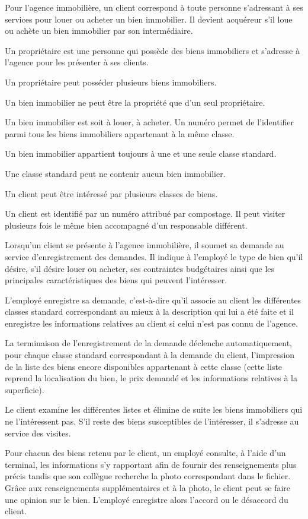 Pour l'agence immobilière, un client correspond à toute personne s'adressant à ses services pour louer ou acheter un bien immobilier. Il devient acquéreur s'il loue ou achète un bien immobilier par son intermédiaire.

Un propriétaire est une personne qui possède des biens immobiliers et s'adresse à l'agence pour les présenter à ses clients.

Un propriétaire peut posséder plusieurs biens immobiliers.

Un bien immobilier ne peut être la propriété que d'un seul propriétaire.

Un bien immobilier est soit à louer, à acheter. Un numéro permet de l'identifier parmi tous les biens immobiliers appartenant à la même classe.

Un bien immobilier appartient toujours à une et une seule classe standard.

Une classe standard peut ne contenir aucun bien immobilier.

Un client peut être intéressé par plusieurs classes de biens.

Un client est identifié par un numéro attribué par compostage. Il peut visiter plusieurs fois le même bien accompagné d'un responsable différent.

Lorsqu'un client se présente à l'agence immobilière, il soumet sa demande au service d'enregistrement des demandes. Il indique à l'employé le type de bien qu'il désire, s'il désire louer ou acheter, ses contraintes budgétaires ainsi que les principales caractéristiques des biens qui peuvent l'intéresser.

L'employé enregistre sa demande, c'est-à-dire qu'il associe au client les différentes classes standard correspondant au mieux à la description qui lui a été faite et il enregistre les informations relatives au client si celui n'est pas connu de l'agence.

La terminaison de l'enregistrement de la demande déclenche automatiquement, pour chaque classe standard correspondant à la demande du client, l'impression de la liste des biens encore disponibles appartenant à cette classe (cette liste reprend la localisation du bien, le prix demandé et les informations relatives à la superficie).

Le client examine les différentes listes et élimine de suite les biens immobiliers qui ne l'intéressent pas. S'il reste des biens susceptibles de l'intéresser, il s'adresse au service des visites.

Pour chacun des biens retenu par le client, un employé consulte, à l'aide d'un terminal, les informations s'y rapportant afin de fournir des renseignements plus précis tandis que son collègue recherche la photo correspondant dans le fichier. Grâce aux renseignements supplémentaires et à la photo, le client peut se faire une opinion sur le bien. L'employé enregistre alors l'accord ou le désaccord du client.


